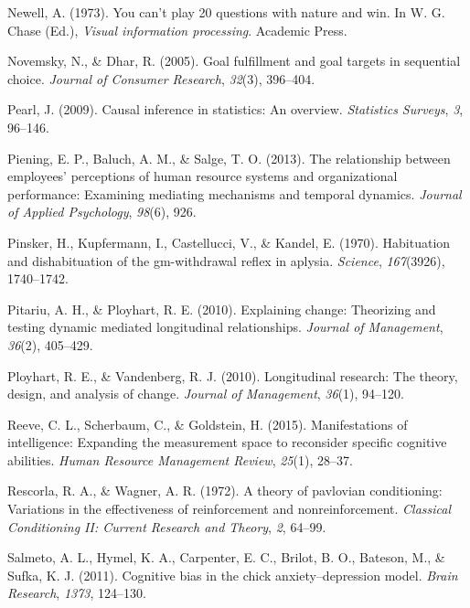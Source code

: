 \documentclass[english,,man]{apa6}
\theoremstyle{definition}
\theoremstyle{definition}
\theoremstyle{definition}
\theoremstyle{remark}
\begin{document}
\leavevmode\hypertarget{ref-newell1973}{}%
Newell, A. (1973). You can't play 20 questions with nature and win. In
W. G. Chase (Ed.), \emph{Visual information processing}. Academic Press.

\leavevmode\hypertarget{ref-novemsky2005}{}%
Novemsky, N., \& Dhar, R. (2005). Goal fulfillment and goal targets in
sequential choice. \emph{Journal of Consumer Research}, \emph{32}(3),
396--404.

\leavevmode\hypertarget{ref-Pearl2009}{}%
Pearl, J. (2009). Causal inference in statistics: An overview.
\emph{Statistics Surveys}, \emph{3}, 96--146.

\leavevmode\hypertarget{ref-piening2013}{}%
Piening, E. P., Baluch, A. M., \& Salge, T. O. (2013). The relationship
between employees' perceptions of human resource systems and
organizational performance: Examining mediating mechanisms and temporal
dynamics. \emph{Journal of Applied Psychology}, \emph{98}(6), 926.

\leavevmode\hypertarget{ref-pinsker1970}{}%
Pinsker, H., Kupfermann, I., Castellucci, V., \& Kandel, E. (1970).
Habituation and dishabituation of the gm-withdrawal reflex in aplysia.
\emph{Science}, \emph{167}(3926), 1740--1742.

\leavevmode\hypertarget{ref-Pitariu2010}{}%
Pitariu, A. H., \& Ployhart, R. E. (2010). Explaining change: Theorizing
and testing dynamic mediated longitudinal relationships. \emph{Journal
of Management}, \emph{36}(2), 405--429.

\leavevmode\hypertarget{ref-Ployhart2010}{}%
Ployhart, R. E., \& Vandenberg, R. J. (2010). Longitudinal research: The
theory, design, and analysis of change. \emph{Journal of Management},
\emph{36}(1), 94--120.

\leavevmode\hypertarget{ref-reeve2015}{}%
Reeve, C. L., Scherbaum, C., \& Goldstein, H. (2015). Manifestations of
intelligence: Expanding the measurement space to reconsider specific
cognitive abilities. \emph{Human Resource Management Review},
\emph{25}(1), 28--37.

\leavevmode\hypertarget{ref-rescorla1972}{}%
Rescorla, R. A., \& Wagner, A. R. (1972). A theory of pavlovian
conditioning: Variations in the effectiveness of reinforcement and
nonreinforcement. \emph{Classical Conditioning II: Current Research and
Theory}, \emph{2}, 64--99.

\leavevmode\hypertarget{ref-salmeto2011}{}%
Salmeto, A. L., Hymel, K. A., Carpenter, E. C., Brilot, B. O., Bateson,
M., \& Sufka, K. J. (2011). Cognitive bias in the chick
anxiety--depression model. \emph{Brain Research}, \emph{1373}, 124--130.
\end{document}
